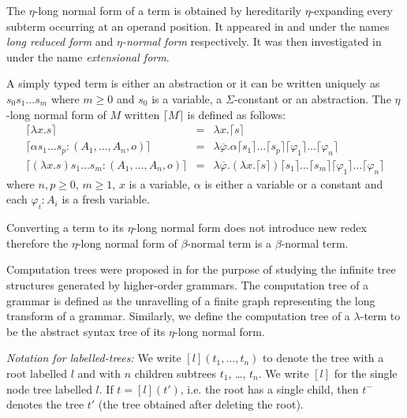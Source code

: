 \documentclass{llncs}
\newcommand\aux[1]{\lceil #1\rceil}
\begin{document}
The $\eta$-long normal form of a term is obtained by hereditarily $\eta$-expanding every
subterm occurring at an operand position.
It appeared in \cite{DBLP:journals/tcs/JensenP76} and
\cite{DBLP:journals/tcs/Huet75} under the names \emph{long reduced
form} and \emph{$\eta$-normal form} respectively. It was then
investigated in \cite{huet76} under the name \emph{extensional form}.

\begin{definition}
A simply typed term is either an abstraction or it can be written uniquely as
$s_0 s_1 \ldots s_m$ where $m\geq0$ and $s_0$ is a variable, a $\Sigma$-constant or an abstraction.
The $\eta$-long normal form of $M$ written $\aux{M}$ is defined as follows:
\begin{eqnarray*}
\aux{\lambda x . s } &=& \lambda x . \aux{s} \\
\aux{\alpha s_1 \ldots s_p : (A_1,\ldots,A_n,o)} &=& \lambda \overline{\varphi} . \alpha \aux{s_1}\ldots \aux{s_p} \aux{\varphi_1} \ldots \aux{\varphi_n} \\
\aux{(\lambda x . s) s_1 \ldots s_m : (A_1,\ldots,A_n,o) } &=& \lambda \overline{\varphi} . (\lambda x . \aux{s}) \aux{s_1} \ldots \aux{s_m} \aux{\varphi_1} \ldots \aux{\varphi_n}
\end{eqnarray*}
where $n,p \geq 0$, $m\geq1$, $x$ is a variable, $\alpha$ is
either a variable or a constant and each $\varphi_i : A_i$ is a fresh variable.
\end{definition}

\begin{remark}
Converting a term to its $\eta$-long normal form does not introduce new redex therefore
the $\eta$-long normal form of $\beta$-normal term is a $\beta$-normal term.
\end{remark}

Computation trees were proposed in \cite{OngLics2006} for the purpose of studying the infinite tree structures generated by higher-order grammars. The computation tree of a grammar is defined as the unravelling of a finite graph representing the long transform of a grammar. Similarly, we define the computation tree of a $\lambda$-term to be the abstract syntax tree of its $\eta$-long normal form.

\emph{Notation for labelled-trees:} We write $[l](t_1, \ldots, t_n)$ to denote the tree with a root labelled $l$ and with $n$ children subtrees $t_1$, \ldots, $t_n$. We write $[l]$ for the single node tree labelled $l$. If $t = [l](t')$, i.e. the root has a single child, then $t^-$ denotes the tree $t'$ (the tree obtained after deleting the root).
\end{document}
